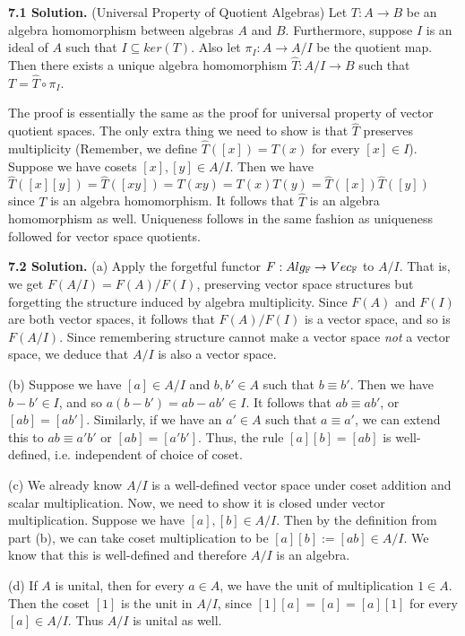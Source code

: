 \textbf{7.1 Solution.} (Universal Property of Quotient Algebras) Let $T: A \to B$ be an algebra homomorphism between algebras $A$ and $B$. Furthermore, suppose $I$ is an ideal of $A$ such that $I \subseteq ker(T)$. Also let $\pi_I: A \to A / I$ be the quotient map. Then there exists a unique algebra homomorphism $\hat{T}: A / I \to B$ such that $T = \hat{T} \circ \pi_I$.

The proof is essentially the same as the proof for universal property of vector quotient spaces. The only extra thing we need to show is that $\hat{T}$ preserves multiplicity (Remember, we define $\hat{T}([x]) = T(x)$ for every $[x] \in I$). Suppose we have cosets $[x], [y] \in A / I$. Then we have $\hat{T}([x][y]) = \hat{T}([xy]) = T(xy) = T(x)T(y) = \hat{T}([x])\hat{T}([y])$ since $T$ is an algebra homomorphism. It follows that $\hat{T}$ is an algebra homomorphism as well. Uniqueness follows in the same fashion as uniqueness followed for vector space quotients.

\textbf{7.2 Solution.} (a) Apply the forgetful functor $F: Alg_{\mathbb{F}} \to Vec_{\mathbb{F}}$ to $A / I$. That is, we get $F(A / I) = F(A) / F(I)$, preserving vector space structures but forgetting the structure induced by algebra multiplicity. Since $F(A)$ and $F(I)$ are both vector spaces, it follows that $F(A) / F(I)$ is a vector space, and so is $F(A / I)$. Since remembering structure cannot make a vector space \textit{not} a vector space, we deduce that $A / I$ is also a vector space.

(b) Suppose we have $[a] \in A / I$ and $b, b' \in A$ such that $b \equiv b'$. Then we have $b - b' \in I$, and so $a(b - b') = ab - ab' \in I$. It follows that $ab \equiv ab'$, or $[ab] = [ab']$. Similarly, if we have an $a' \in A$ such that $a \equiv a'$, we can extend this to $ab \equiv a'b'$ or $[ab] = [a'b']$. Thus, the rule $[a][b] = [ab]$ is well-defined, i.e. independent of choice of coset.

(c) We already know $A / I$ is a well-defined vector space under coset addition and scalar multiplication. Now, we need to show it is closed under vector multiplication. Suppose we have $[a], [b] \in A / I$. Then by the definition from part (b), we can take coset multiplication to be $[a][b] := [ab] \in A / I$. We know that this is well-defined and therefore $A / I$ is an algebra.

(d) If $A$ is unital, then for every $a \in A$, we have the unit of multiplication $1 \in A$. Then the coset $[1]$ is the unit in $A / I$, since $[1][a] = [a] = [a][1]$ for every $[a] \in A / I$. Thus $A / I$ is unital as well.

